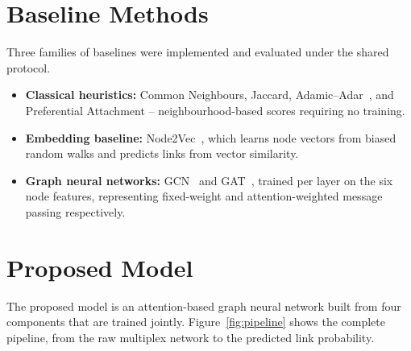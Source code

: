 \section{Baseline Methods}
Three families of baselines were implemented and evaluated under the shared protocol.
\begin{itemize}
  \item \textbf{Classical heuristics:} Common Neighbours, Jaccard, Adamic--Adar~\cite{adamic2003},
        and Preferential Attachment -- neighbourhood-based scores requiring no training.
  \item \textbf{Embedding baseline:} Node2Vec~\cite{node2vec}, which learns node vectors from biased
        random walks and predicts links from vector similarity.
  \item \textbf{Graph neural networks:} GCN~\cite{gcn} and GAT~\cite{gat}, trained per layer on the
        six node features, representing fixed-weight and attention-weighted message passing
        respectively.
\end{itemize}

\section{Proposed Model}
\label{sec:proposed}
The proposed model is an attention-based graph neural network built from four components that are
trained jointly. Figure~\ref{fig:pipeline} shows the complete pipeline, from the raw multiplex
network to the predicted link probability.

